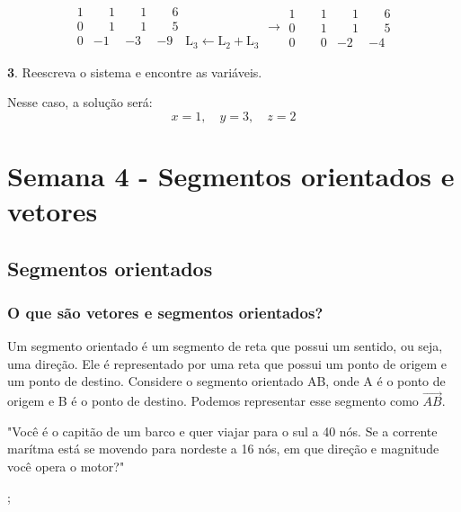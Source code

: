 \documentclass[12pt]{article}
\begin{document}
\[
    \begin{array}{rrr|l}
        1  &  \phantom{-}1  &  \phantom{-}1  &  \phantom{-}6 \\
        0  &  \phantom{-}1  &  \phantom{-}1  &  \phantom{-}5 \\
        0  &            -1  &            -3  &            -9 \quad \text{L}_3 \leftarrow \text{L}_2 + \text{L}_3
    \end{array}
\rightarrow
\begin{array}{rrr|l}
    1  &  \phantom{-}1  &  \phantom{-}1  &  \phantom{-}6 \\
    0  &  \phantom{-}1  &  \phantom{-}1  &  \phantom{-}5 \\
    0  &  \phantom{-}0  &            -2  &            -4
\end{array}
\]

\textbf{3}. Reescreva o sistema e encontre as variáveis.

Nesse caso, a solução será:
\[
x = 1, \quad y = 3, \quad z = 2
\]

\section{Semana 4 - Segmentos orientados e vetores}
\subsection{Segmentos orientados}
\subsubsection{O que são vetores e segmentos orientados?}
Um segmento orientado é um segmento de reta que possui um sentido, ou seja, uma direção.
Ele é representado por uma reta que possui um ponto de origem e um ponto de destino.
Considere o segmento orientado AB, onde A é o ponto de origem e B é o ponto de destino. Podemos representar esse segmento como $\overrightarrow{AB}$.

\noindent
"Você é o capitão de um barco e quer viajar para o sul a 40 nós. Se a corrente marítma está se movendo para nordeste a 16 nós,
em que direção e magnitude você opera o motor?"

;
\end{document}
